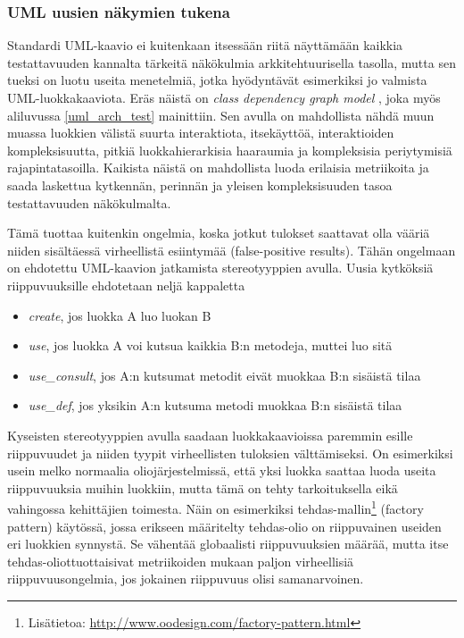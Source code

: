\documentclass[finnish]{tktltiki2}
\numberwithin{table}{section}
\theoremstyle{definition}
\theoremstyle{remark}
\begin{document}
\subsubsection{UML uusien näkymien tukena}


Standardi UML-kaavio ei kuitenkaan itsessään riitä näyttämään kaikkia testattavuuden kannalta tärkeitä näkökulmia arkkitehtuurisella tasolla, mutta sen tueksi on luotu useita menetelmiä, jotka hyödyntävät esimerkiksi jo valmista UML-luokkakaaviota. Eräs näistä on \textit{class dependency graph model} \citep{baudry_testability_2002}, joka myös aliluvussa \ref{uml_arch_test} mainittiin. Sen avulla on mahdollista nähdä muun muassa luokkien välistä suurta interaktiota, itsekäyttöä, interaktioiden kompleksisuutta, pitkiä luokkahierarkisia haaraumia ja kompleksisia periytymisiä rajapintatasoilla.
Kaikista näistä on mahdollista luoda erilaisia metriikoita ja saada laskettua kytkennän, perinnän ja yleisen kompleksisuuden tasoa testattavuuden näkökulmalta. 

Tämä tuottaa kuitenkin ongelmia, koska jotkut tulokset saattavat olla vääriä niiden sisältäessä virheellistä esiintymää (false-positive results). Tähän ongelmaan on ehdotettu UML-kaavion jatkamista stereotyyppien avulla. Uusia kytköksiä riippuvuuksille ehdotetaan neljä kappaletta \citep[s. 4]{baudry_measuring_2003}

\begin{itemize}
	\item \textit{create}, jos luokka A luo luokan B
	\item \textit{use}, jos luokka A voi kutsua kaikkia B:n metodeja, muttei luo sitä
	\item \textit{use\_consult}, jos A:n kutsumat metodit eivät muokkaa B:n sisäistä tilaa
	\item \textit{use\_def}, jos yksikin A:n kutsuma metodi muokkaa B:n sisäistä tilaa
\end{itemize}

\noindent
Kyseisten stereotyyppien avulla saadaan luokkakaavioissa paremmin esille riippuvuudet ja niiden tyypit virheellisten tuloksien välttämiseksi. On esimerkiksi usein melko normaalia oliojärjestelmissä, että yksi luokka saattaa luoda useita riippuvuuksia muihin luokkiin, mutta tämä on tehty tarkoituksella eikä vahingossa kehittäjien toimesta. Näin on esimerkiksi tehdas-mallin\footnote{Lisätietoa: \url{http://www.oodesign.com/factory-pattern.html}} (factory pattern) käytössä, jossa erikseen määritelty tehdas-olio on riippuvainen useiden eri luokkien synnystä. Se vähentää globaalisti riippuvuuksien määrää, mutta itse tehdas-oliottuottaisivat metriikoiden mukaan paljon virheellisiä riippuvuusongelmia, jos jokainen riippuvuus olisi samanarvoinen.
\end{document}
